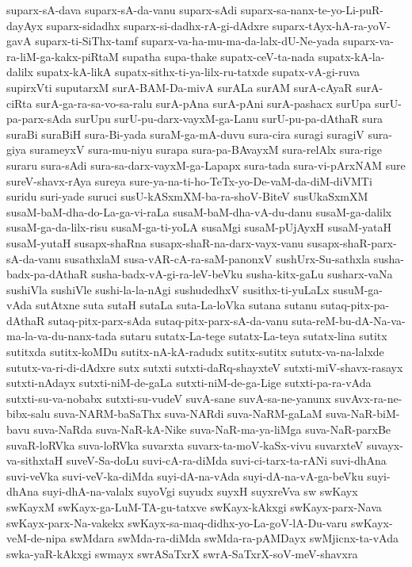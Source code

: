 {suparx-sA-dava
suparx-sA-da-vanu
suparx-sAdi
suparx-sa-nanx-te-yo-Li-puR-dayAyx
suparx-sidadhx
suparx-si-dadhx-rA-gi-dAdxre
suparx-tAyx-hA-ra-yoV-gavA
suparx-ti-SiThx-tamf
suparx-va-ha-mu-ma-da-lalx-dU-Ne-yada
suparx-va-ra-liM-ga-kakx-piRtaM
supatha
supa-thake
supatx-ceV-ta-nada
supatx-kA-la-dalilx
supatx-kA-likA
supatx-sithx-ti-ya-lilx-ru-tatxde
supatx-vA-gi-ruva
supirxVti
suputarxM
surA-BAM-Da-mivA
surALa
surAM
surA-cAyaR
surA-ciRta
surA-ga-ra-sa-vo-sa-ralu
surA-pAna
surA-pAni
surA-pashacx
surUpa
surU-pa-parx-sAda
surUpu
surU-pu-darx-vayxM-ga-Lanu
surU-pu-pa-dAthaR
sura
suraBi
suraBiH
sura-Bi-yada
suraM-ga-mA-duvu
sura-cira
suragi
suragiV
sura-giya
surameyxV
sura-mu-niyu
surapa
sura-pa-BAvayxM
sura-relAlx
sura-rige
suraru
sura-sAdi
sura-sa-darx-vayxM-ga-Lapapx
sura-tada
sura-vi-pArxNAM
sure
sureV-shavx-rAya
sureya
sure-ya-na-ti-ho-TeTx-yo-De-vaM-da-diM-diVMTi
suridu
suri-yade
suruci
susU-kASxmXM-ba-ra-shoV-BiteV
susUkaSxmXM
susaM-baM-dha-do-La-ga-vi-raLa
susaM-baM-dha-vA-du-danu
susaM-ga-dalilx
susaM-ga-da-lilx-risu
susaM-ga-ti-yoLA
susaMgi
susaM-pUjAyxH
susaM-yataH
susaM-yutaH
susapx-shaRna
susapx-shaR-na-darx-vayx-vanu
susapx-shaR-parx-sA-da-vanu
susathxlaM
susa-vAR-cA-ra-saM-panonxV
sushUrx-Su-sathxla
susha-badx-pa-dAthaR
susha-badx-vA-gi-ra-leV-beVku
susha-kitx-gaLu
susharx-vaNa
sushiVla
sushiVle
sushi-la-la-nAgi
sushudedhxV
susithx-ti-yuLaLx
susuM-ga-vAda
sutAtxne
suta
sutaH
sutaLa
suta-La-loVka
sutana
sutanu
sutaq-pitx-pa-dAthaR
sutaq-pitx-parx-sAda
sutaq-pitx-parx-sA-da-vanu
suta-reM-bu-dA-Na-va-ma-la-va-du-nanx-tada
sutaru
sutatx-La-tege
sutatx-La-teya
sutatx-lina
sutitx
sutitxda
sutitx-koMDu
sutitx-nA-kA-radudx
sutitx-sutitx
sututx-va-na-lalxde
sututx-va-ri-di-dAdxre
sutx
sutxti
sutxti-daRq-shayxteV
sutxti-miV-shavx-rasayx
sutxti-nAdayx
sutxti-niM-de-gaLa
sutxti-niM-de-ga-Lige
sutxti-pa-ra-vAda
sutxti-su-va-nobabx
sutxti-su-vudeV
suvA-sane
suvA-sa-ne-yanunx
suvAvx-ra-ne-bibx-salu
suva-NARM-baSaThx
suva-NARdi
suva-NaRM-gaLaM
suva-NaR-biM-bavu
suva-NaRda
suva-NaR-kA-Nike
suva-NaR-ma-ya-liMga
suva-NaR-parxBe
suvaR-loRVka
suva-loRVka
suvarxta
suvarx-ta-moV-kaSx-vivu
suvarxteV
suvayx-va-sithxtaH
suveV-Sa-doLu
suvi-cA-ra-diMda
suvi-ci-tarx-ta-rANi
suvi-dhAna
suvi-veVka
suvi-veV-ka-diMda
suyi-dA-na-vAda
suyi-dA-na-vA-ga-beVku
suyi-dhAna
suyi-dhA-na-valalx
suyoVgi
suyudx
suyxH
suyxreVva
sw
swKayx
swKayxM
swKayx-ga-LuM-TA-gu-tatxve
swKayx-kAkxgi
swKayx-parx-Nava
swKayx-parx-Na-vakekx
swKayx-sa-maq-didhx-yo-La-goV-lA-Du-varu
swKayx-veM-de-nipa
swMdara
swMda-ra-diMda
swMda-ra-pAMDayx
swMjicnx-ta-vAda
swka-yaR-kAkxgi
swmayx
swrASaTxrX
swrA-SaTxrX-soV-meV-shavxra
}
